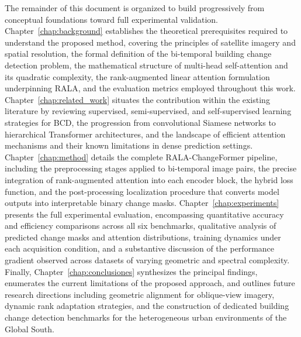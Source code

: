 The remainder of this document is organized to build progressively from
conceptual foundations toward full experimental validation.
Chapter~\ref{chap:background} establishes the theoretical prerequisites required
to understand the proposed method, covering the principles of satellite imagery
and spatial resolution, the formal definition of the bi-temporal building change
detection problem, the mathematical structure of multi-head self-attention and
its quadratic complexity, the rank-augmented linear attention formulation
underpinning RALA, and the evaluation metrics employed throughout this work.
Chapter~\ref{chap:related_work} situates the contribution within the existing
literature by reviewing supervised, semi-supervised, and self-supervised learning
strategies for BCD, the progression from convolutional Siamese networks to
hierarchical Transformer architectures, and the landscape of efficient attention
mechanisms and their known limitations in dense prediction settings.
Chapter~\ref{chap:method} details the complete RALA-ChangeFormer pipeline,
including the preprocessing stages applied to bi-temporal image pairs, the
precise integration of rank-augmented attention into each encoder block, the
hybrid loss function, and the post-processing localization procedure that
converts model outputs into interpretable binary change masks.
Chapter~\ref{chap:experiments} presents the full experimental evaluation,
encompassing quantitative accuracy and efficiency comparisons across all six
benchmarks, qualitative analysis of predicted change masks and attention
distributions, training dynamics under each acquisition condition, and a
substantive discussion of the performance gradient observed across datasets of
varying geometric and spectral complexity. Finally,
Chapter~\ref{chap:conclusiones} synthesizes the principal findings, enumerates
the current limitations of the proposed approach, and outlines future research
directions including geometric alignment for oblique-view imagery, dynamic rank
adaptation strategies, and the construction of dedicated building change
detection benchmarks for the heterogeneous urban environments of the Global South.
